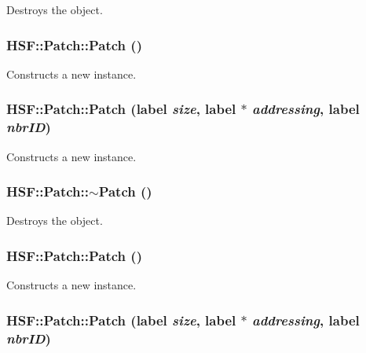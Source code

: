 Destroys the object. \hypertarget{classHSF_1_1Patch_a8bbb4ee433e8b808809e1de6ccc4b06a}{
\subsubsection[{Patch}]{\setlength{\rightskip}{0pt plus 5cm}HSF::Patch::Patch ()}}
\label{classHSF_1_1Patch_a8bbb4ee433e8b808809e1de6ccc4b06a}


Constructs a new instance. \hypertarget{classHSF_1_1Patch_a9a1d8945a0e699397820dc7c83dd706f}{
\subsubsection[{Patch}]{\setlength{\rightskip}{0pt plus 5cm}HSF::Patch::Patch (label {\em size}, \/  label $\ast$ {\em addressing}, \/  label {\em nbrID})}}
\label{classHSF_1_1Patch_a9a1d8945a0e699397820dc7c83dd706f}


Constructs a new instance. \hypertarget{classHSF_1_1Patch_ac4002381f5600d00ce48e8d2a1d979c4}{
\subsubsection[{$\sim$Patch}]{\setlength{\rightskip}{0pt plus 5cm}HSF::Patch::$\sim$Patch ()}}
\label{classHSF_1_1Patch_ac4002381f5600d00ce48e8d2a1d979c4}


Destroys the object. \hypertarget{classHSF_1_1Patch_a8bbb4ee433e8b808809e1de6ccc4b06a}{
\subsubsection[{Patch}]{\setlength{\rightskip}{0pt plus 5cm}HSF::Patch::Patch ()}}
\label{classHSF_1_1Patch_a8bbb4ee433e8b808809e1de6ccc4b06a}


Constructs a new instance. \hypertarget{classHSF_1_1Patch_a9a1d8945a0e699397820dc7c83dd706f}{
\subsubsection[{Patch}]{\setlength{\rightskip}{0pt plus 5cm}HSF::Patch::Patch (label {\em size}, \/  label $\ast$ {\em addressing}, \/  label {\em nbrID})}}
\label{classHSF_1_1Patch_a9a1d8945a0e699397820dc7c83dd706f}


